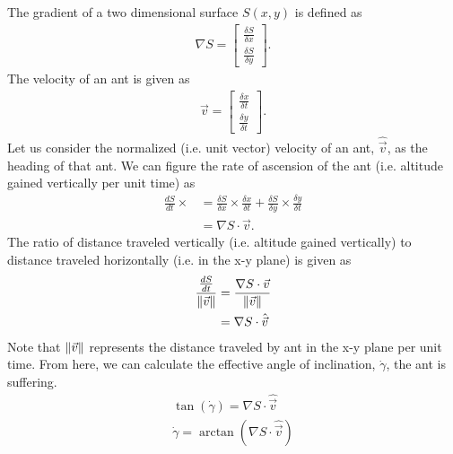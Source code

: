 \documentclass{article}
\DeclarePairedDelimiter\norm{\lVert}{\rVert}%
\begin{document}
The gradient of a two dimensional surface $S(x,y)$ is defined as
\begin{align*}
\nabla S = \begin{bmatrix}
           \frac{\delta S}{\delta x}  \\
           \frac{\delta S}{\delta y}
         \end{bmatrix}.
\end{align*}
The velocity of an ant is given as
\begin{align*}
\vec{v} = \begin{bmatrix}
           \frac{\delta x}{\delta t}  \\
           \frac{\delta y}{\delta t}
         \end{bmatrix}.
\end{align*}
Let us consider the normalized (i.e. unit vector) velocity of an ant, $\hat{\vec{v}}$, as the heading of that ant. 
We can figure the rate of ascension of the ant (i.e. altitude gained vertically per unit time) as
\begin{align*}
\frac{d S}{d t} \times 
&= \frac{\delta S}{\delta x} \times \frac{\delta x}{\delta t} + \frac{\delta S}{\delta y} \times \frac{\delta y}{\delta t} \\
&= \nabla S \cdot \vec{v}.
\end{align*}
The ratio of distance traveled vertically (i.e. altitude gained vertically) to distance traveled horizontally (i.e. in the x-y plane) is given as
\begin{align*}
\frac{\frac{d S}{d t}}{\norm{\vec{v}}} 
&= \frac{ \nabla S \cdot \vec{v}}{\norm{\vec{v}}} \\
&= \nabla S \cdot \hat{\vec{v}}
\end{align*}
Note that $\norm{\vec{v}}$ represents the distance traveled by ant in the x-y plane per unit time.
From here, we can calculate the effective angle of inclination, $\dot{\gamma}$, the ant is suffering.
\begin{align*}
\tan{(\dot{\gamma})} = \nabla S \cdot \hat{\vec{v}} \\
\dot{\gamma} = \arctan{(\nabla S \cdot \hat{\vec{v}})}
\end{align*}

 
 
\end{document}
